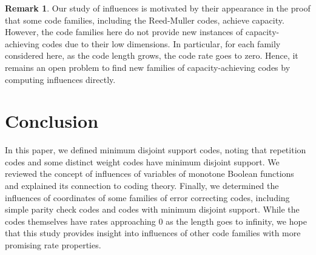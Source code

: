 \documentclass[12pt]{article}
\theoremstyle{definition}
\newtheorem{remark}[theorem]{Remark}
\begin{document}
\begin{remark}
    Our study of influences is motivated by their appearance in the proof that some code families, including the Reed-Muller codes, achieve capacity. However, the code families here do not provide new instances of capacity-achieving codes due to their low dimensions. In particular, for each family considered here, as the code length grows, the code rate goes to zero. Hence, it remains an open problem to find new families of capacity-achieving codes by computing influences directly.
\end{remark}

\section{Conclusion} \label{conclusion_section}

In this paper, we defined minimum disjoint support codes, noting that repetition codes and some distinct weight codes have minimum disjoint support. We reviewed the concept of influences of variables of monotone Boolean functions and explained its connection to coding theory. Finally, we determined the influences of coordinates of some families of error correcting codes, including simple parity check codes and codes with minimum disjoint support. While the codes themselves have rates approaching $0$ as the length goes to infinity, we hope that this study provides insight into influences of other code families with more promising rate properties. 

{}

\end{document}
